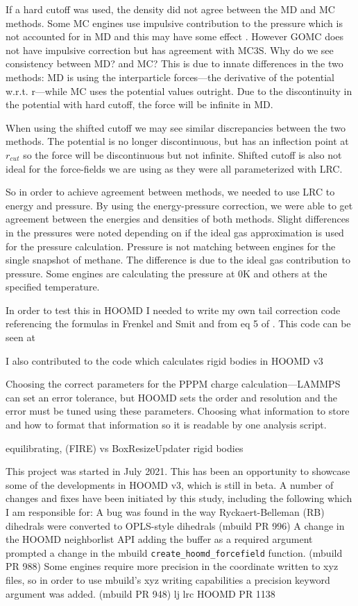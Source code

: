 If a hard cutoff was used, the density did not agree between the MD and MC methods.
Some MC engines use impulsive contribution to the pressure which is not accounted for in MD and this may have some effect \citep{frenkel2001understanding}.
However GOMC does not have impulsive correction but has agreement with MC3S. Why do we see consistency between MD? and MC?
This is due to innate differences in the two methods: MD is using the interparticle forces---the derivative of the potential w.r.t. r---while MC uses the potential values outright.
Due to the discontinuity in the potential with hard cutoff, the force will be infinite in MD.

When using the shifted cutoff we may see similar discrepancies between the two methods. 
The potential is no longer discontinuous, but has an inflection point at $r_{cut}$ so the force will be discontinuous but not infinite.
Shifted cutoff is also not ideal for the force-fields we are using as they were all parameterized with LRC. 

So in order to achieve agreement between methods, we needed to use LRC to energy and pressure. 
By using the energy-pressure correction, we were able to get agreement between the energies and densities of both methods. 
Slight differences in the pressures were noted depending on if the ideal gas approximation is used for the pressure calculation.
Pressure is not matching between engines for the single snapshot of methane. 
The difference is due to the ideal gas contribution to pressure. 
Some engines are calculating the pressure at 0K and others at the specified temperature.

In order to test this in HOOMD I needed to write my own tail correction code referencing the formulas in Frenkel and Smit  \citep{frenkel2001understanding} and from eq 5 of  \citep{Sun1998}. 
This code can be seen at %

I also contributed to the code which calculates rigid bodies in HOOMD v3 %

Choosing the correct parameters for the PPPM charge calculation---LAMMPS can set an error tolerance, but HOOMD sets the order and resolution and the error must be tuned using these parameters.
Choosing what information to store and how to format that information so it is readable by one analysis script. 

equilibrating, (FIRE) vs BoxResizeUpdater
rigid bodies

This project was started in July 2021. 
This has been an opportunity to showcase some of the developments in HOOMD v3, which is still in beta. 
A number of changes and fixes have been initiated by this study, including the following which I am responsible for:
A bug was found in the way Ryckaert-Belleman (RB) dihedrals were converted to OPLS-style dihedrals (mbuild PR 996)
A change in the HOOMD neighborlist API adding the buffer as a required argument prompted a change in the mbuild \lstinline{create_hoomd_forcefield} function. (mbuild PR 988)
Some engines require more precision in the coordinate written to xyz files, so in order to use mbuild's xyz writing capabilities a precision keyword argument was added. (mbuild PR 948)
lj lrc HOOMD PR 1138

